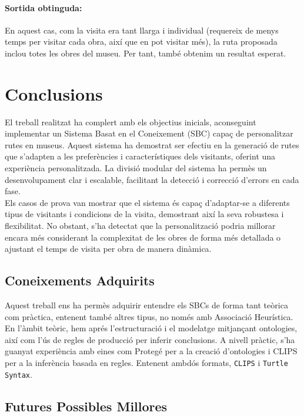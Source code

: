 \documentclass[a4paper]{article}
\begin{document}
	\paragraph{Sortida obtinguda:}
	En aquest cas, com la visita era tant llarga i individual (requereix de menys temps per visitar cada obra, així que en pot visitar més), la ruta proposada inclou totes les obres del museu. Per tant, també obtenim un resultat esperat.
	
	\newpage
	\section{Conclusions}
	
	El treball realitzat ha complert amb els objectius inicials, aconseguint implementar un Sistema Basat en el Coneixement (SBC) capaç de personalitzar rutes en museus. Aquest sistema ha demostrat ser efectiu en la generació de rutes que s'adapten a les preferències i característiques dels visitants, oferint una experiència personalitzada. La divisió modular del sistema ha permès un desenvolupament clar i escalable, facilitant la detecció i correcció d'errors en cada fase. \\ 
	
	Els casos de prova van mostrar que el sistema és capaç d'adaptar-se a diferents tipus de visitants i condicions de la visita, demostrant així la seva robustesa i flexibilitat. No obstant, s'ha detectat que la personalització podria millorar encara més considerant la complexitat de les obres de forma més detallada o ajustant el temps de visita per obra de manera dinàmica.
	
	\subsection{Coneixements Adquirits}
	
	Aquest treball ens ha permès adquirir entendre els SBCs de forma tant teòrica com pràctica, entenent també altres tipus, no només amb Associació Heurística. En l'àmbit teòric, hem aprés l'estructuració i el modelatge mitjançant ontologies, així com l'ús de regles de producció per inferir conclusions. A nivell pràctic, s'ha guanyat experiència amb eines com Protegé per a la creació d'ontologies i CLIPS per a la inferència basada en regles. Entenent ambdós formats, \texttt{CLIPS} i \texttt{Turtle Syntax}. \\
	
	\subsection{Futures Possibles Millores}
	
\end{document}
